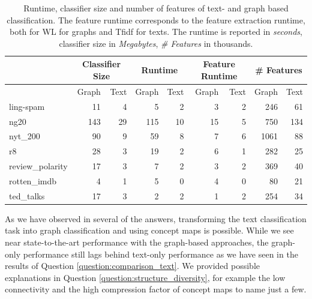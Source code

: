 \begin{table}[htb!]
	\centering
	\begin{tabular}{lrrrrrrrr}
		& \multicolumn{2}{c}{Classifier Size} &  \multicolumn{2}{c}{Runtime} &  \multicolumn{2}{c}{Feature Runtime} &  \multicolumn{2}{c}{\# Features} \\
		\midrule
		&  Graph &  Text &  Graph &  Text & Graph &  Text  & Graph &  Text \\
		\midrule
ling-spam       & 11 & 4 & 5 & 2 & 3 & 2 & 246 & 61 \\
ng20            & 143 & 29 & 115 & 10 & 15 & 5 & 750 & 134 \\
nyt\_200         & 90 & 9 & 59 & 8 & 7 & 6 & 1061 & 88 \\
r8              & 28 & 3 & 19 & 2 & 6 & 1 & 282 & 25 \\
review\_polarity & 17 & 3 & 7 & 2 & 3 & 2 & 369 & 40 \\
rotten\_imdb     & 4 & 1 & 5 & 0 & 4 & 0 & 80 & 21 \\
ted\_talks       & 17 & 3 & 2 & 2 & 1 & 2 & 254 & 34 \\
		\bottomrule
	\end{tabular}
\caption[Table: Runtime, classifier size and \# features for graph- and text based classification.]{
	Runtime, classifier size and number of features of text- and graph based classification.
	The feature runtime corresponds to the feature extraction runtime, both for WL for graphs and Tfidf for texts.
	The runtime is reported in \textit{seconds}, classifier size in \textit{Megabytes}, \textit{\# Features} in thousands.
}
\label{table:runtime_and_classifier_size}
\end{table}


As we have observed in several of the answers, transforming the text classification task into graph classification and using concept maps is possible.
While we see near state-to-the-art performance with the graph-based approaches, the graph-only performance still lags behind text-only performance as we have seen in the results of Question \ref{question:comparison_text}.
We provided possible explanations in Question \ref{question:structure_diversity}, for example the low connectivity and the high compression factor of concept maps to name just a few.

